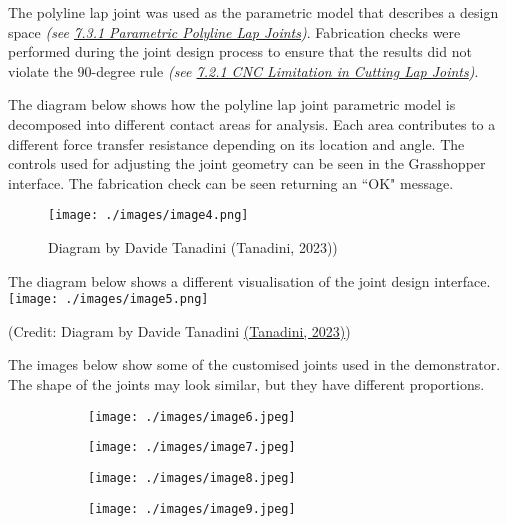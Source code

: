 The polyline lap joint was used as the parametric model that describes a design space \textit{(see \uline{7.3.1 Parametric Polyline Lap Joints})}. Fabrication checks were performed during the joint design process to ensure that the results did not violate the 90-degree rule \textit{(see \uline{7.2.1 CNC Limitation in Cutting Lap Joints})}. 

The diagram below shows how the polyline lap joint parametric model is decomposed into different contact areas for analysis. Each area contributes to a different force transfer resistance depending on its location and angle. The controls used for adjusting the joint geometry can be seen in the Grasshopper interface. The fabrication check can be seen returning an ``OK" message.

\begin{figure}[H]
\texttt{[image: ./images/image4.png]}
\caption{Diagram by Davide Tanadini (Tanadini, 2023))}
\label{fig:diagram_davide_tanadini_tanadini_2023}
\end{figure}


The diagram below shows a different visualisation of the joint design interface. \texttt{[image: ./images/image5.png]}

{\footnotesize (Credit: Diagram by Davide Tanadini \href{https://www.zotero.org/google-docs/?U562KI}{(Tanadini, 2023)})}

The images below show some of the customised joints used in the demonstrator. The shape of the joints may look similar, but they have different proportions. 

\begin{figure}[H]
\centering
\begin{subfigure}[b]{0.23\textwidth}
\centering
\texttt{[image: ./images/image6.jpeg]}
\end{subfigure}
\hfill
\begin{subfigure}[b]{0.23\textwidth}
\centering
\texttt{[image: ./images/image7.jpeg]}
\end{subfigure}
\hfill
\begin{subfigure}[b]{0.23\textwidth}
\centering
\texttt{[image: ./images/image8.jpeg]}
\end{subfigure}
\hfill
\begin{subfigure}[b]{0.23\textwidth}
\centering
\texttt{[image: ./images/image9.jpeg]}
\end{subfigure}
\end{figure}


